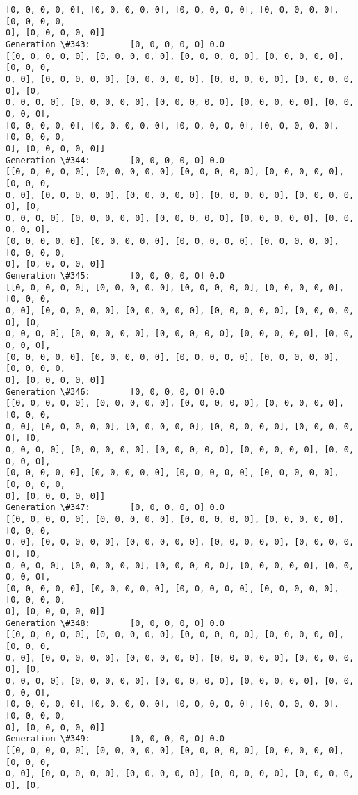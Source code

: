\documentclass[11pt]{article}
\begin{document}
\begin{Verbatim}[commandchars=\\\{\}]
[0, 0, 0, 0, 0], [0, 0, 0, 0, 0], [0, 0, 0, 0, 0], [0, 0, 0, 0, 0], [0, 0, 0, 0,
0], [0, 0, 0, 0, 0]]
Generation \#343:        [0, 0, 0, 0, 0] 0.0
[[0, 0, 0, 0, 0], [0, 0, 0, 0, 0], [0, 0, 0, 0, 0], [0, 0, 0, 0, 0], [0, 0, 0,
0, 0], [0, 0, 0, 0, 0], [0, 0, 0, 0, 0], [0, 0, 0, 0, 0], [0, 0, 0, 0, 0], [0,
0, 0, 0, 0], [0, 0, 0, 0, 0], [0, 0, 0, 0, 0], [0, 0, 0, 0, 0], [0, 0, 0, 0, 0],
[0, 0, 0, 0, 0], [0, 0, 0, 0, 0], [0, 0, 0, 0, 0], [0, 0, 0, 0, 0], [0, 0, 0, 0,
0], [0, 0, 0, 0, 0]]
Generation \#344:        [0, 0, 0, 0, 0] 0.0
[[0, 0, 0, 0, 0], [0, 0, 0, 0, 0], [0, 0, 0, 0, 0], [0, 0, 0, 0, 0], [0, 0, 0,
0, 0], [0, 0, 0, 0, 0], [0, 0, 0, 0, 0], [0, 0, 0, 0, 0], [0, 0, 0, 0, 0], [0,
0, 0, 0, 0], [0, 0, 0, 0, 0], [0, 0, 0, 0, 0], [0, 0, 0, 0, 0], [0, 0, 0, 0, 0],
[0, 0, 0, 0, 0], [0, 0, 0, 0, 0], [0, 0, 0, 0, 0], [0, 0, 0, 0, 0], [0, 0, 0, 0,
0], [0, 0, 0, 0, 0]]
Generation \#345:        [0, 0, 0, 0, 0] 0.0
[[0, 0, 0, 0, 0], [0, 0, 0, 0, 0], [0, 0, 0, 0, 0], [0, 0, 0, 0, 0], [0, 0, 0,
0, 0], [0, 0, 0, 0, 0], [0, 0, 0, 0, 0], [0, 0, 0, 0, 0], [0, 0, 0, 0, 0], [0,
0, 0, 0, 0], [0, 0, 0, 0, 0], [0, 0, 0, 0, 0], [0, 0, 0, 0, 0], [0, 0, 0, 0, 0],
[0, 0, 0, 0, 0], [0, 0, 0, 0, 0], [0, 0, 0, 0, 0], [0, 0, 0, 0, 0], [0, 0, 0, 0,
0], [0, 0, 0, 0, 0]]
Generation \#346:        [0, 0, 0, 0, 0] 0.0
[[0, 0, 0, 0, 0], [0, 0, 0, 0, 0], [0, 0, 0, 0, 0], [0, 0, 0, 0, 0], [0, 0, 0,
0, 0], [0, 0, 0, 0, 0], [0, 0, 0, 0, 0], [0, 0, 0, 0, 0], [0, 0, 0, 0, 0], [0,
0, 0, 0, 0], [0, 0, 0, 0, 0], [0, 0, 0, 0, 0], [0, 0, 0, 0, 0], [0, 0, 0, 0, 0],
[0, 0, 0, 0, 0], [0, 0, 0, 0, 0], [0, 0, 0, 0, 0], [0, 0, 0, 0, 0], [0, 0, 0, 0,
0], [0, 0, 0, 0, 0]]
Generation \#347:        [0, 0, 0, 0, 0] 0.0
[[0, 0, 0, 0, 0], [0, 0, 0, 0, 0], [0, 0, 0, 0, 0], [0, 0, 0, 0, 0], [0, 0, 0,
0, 0], [0, 0, 0, 0, 0], [0, 0, 0, 0, 0], [0, 0, 0, 0, 0], [0, 0, 0, 0, 0], [0,
0, 0, 0, 0], [0, 0, 0, 0, 0], [0, 0, 0, 0, 0], [0, 0, 0, 0, 0], [0, 0, 0, 0, 0],
[0, 0, 0, 0, 0], [0, 0, 0, 0, 0], [0, 0, 0, 0, 0], [0, 0, 0, 0, 0], [0, 0, 0, 0,
0], [0, 0, 0, 0, 0]]
Generation \#348:        [0, 0, 0, 0, 0] 0.0
[[0, 0, 0, 0, 0], [0, 0, 0, 0, 0], [0, 0, 0, 0, 0], [0, 0, 0, 0, 0], [0, 0, 0,
0, 0], [0, 0, 0, 0, 0], [0, 0, 0, 0, 0], [0, 0, 0, 0, 0], [0, 0, 0, 0, 0], [0,
0, 0, 0, 0], [0, 0, 0, 0, 0], [0, 0, 0, 0, 0], [0, 0, 0, 0, 0], [0, 0, 0, 0, 0],
[0, 0, 0, 0, 0], [0, 0, 0, 0, 0], [0, 0, 0, 0, 0], [0, 0, 0, 0, 0], [0, 0, 0, 0,
0], [0, 0, 0, 0, 0]]
Generation \#349:        [0, 0, 0, 0, 0] 0.0
[[0, 0, 0, 0, 0], [0, 0, 0, 0, 0], [0, 0, 0, 0, 0], [0, 0, 0, 0, 0], [0, 0, 0,
0, 0], [0, 0, 0, 0, 0], [0, 0, 0, 0, 0], [0, 0, 0, 0, 0], [0, 0, 0, 0, 0], [0,

\end{Verbatim}
\end{document}
